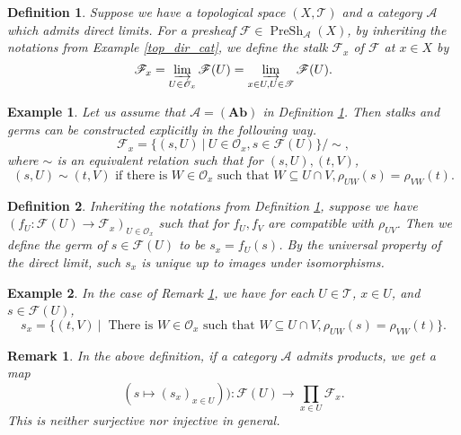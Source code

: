 \documentclass{article}
\newtheorem{definition}{Definition}[section]
\newtheorem{remark}{Remark}[section]
\newtheorem{example}{Example}[section]
\numberwithin{equation}{section}
\DeclareMathOperator{\PreSh}{PreSh}
\begin{document}
\begin{definition}
\label{def_stalk}
Suppose we have a topological space $(X,\mathcal{T})$ and a category $\mathcal{A}$ which admits direct limits. For a presheaf $\mathcal{F}\in\PreSh_{\mathcal{A}}(X)$, by inheriting the notations from Example \ref{top_dir_cat}, we define the stalk $\mathcal{F}_x$ of $\mathcal{F}$ at $x\in X$ by
\begin{equation*}
\mathcal{F}_x = \varinjlim_{U\in\mathcal{O}_x}\mathcal{F}(U) =  \varinjlim_{x\in U,U\in\mathcal{T}}\mathcal{F}(U).
\end{equation*}
\end{definition}

\begin{example}
\label{stalk_ex1}
Let us assume that $\mathcal{A}=(\mathbf{Ab})$ in Definition \ref{def_stalk}. Then stalks and germs can be constructed explicitly in the following way.
\begin{equation*}
\mathcal{F}_x = \{(s,U)\:|\: U\in\mathcal{O}_x, s\in\mathcal{F}(U)\}/\sim,
\end{equation*}
where $\sim$ is an equivalent relation such that for $(s,U),(t,V)$,
\begin{equation*}
(s,U)\sim(t,V) \text{ if there is } W\in\mathcal{O}_x \text{ such that } W\subseteq U\cap V, \rho_{UW}(s)=\rho_{VW}(t).
\end{equation*}
\end{example}

\begin{definition}
Inheriting the notations from Definition \ref{def_stalk}, suppose we have $(f_U:\mathcal{F}(U)\to\mathcal{F}_x)_{U\in\mathcal{O}_x}$ such that for $f_U, f_V$ are compatible with $\rho_{UV}$. Then we define the germ of $s\in\mathcal{F}(U)$ to be $s_x=f_U(s)$. By the universal property of the direct limit, such $s_x$ is unique up to images under isomorphisms.
\end{definition}

\begin{example}
In the case of Remark \ref{stalk_ex1}, we have for each $U\in\mathcal{T}$, $x\in U$, and $s\in\mathcal{F}(U)$,
\begin{equation*}
s_x = \{(t,V)\:|\: \text{ There is } W\in\mathcal{O}_x \text{ such that } W\subseteq U\cap V, \rho_{UW}(s)=\rho_{VW}(t)\}.
\end{equation*}
\end{example}

\begin{remark}
In the above definition, if a category $\mathcal{A}$ admits products, we get a map
\begin{equation}
\label{germ_map}
(s\mapsto (s_x)_{x\in U})):\mathcal{F}(U)\to\prod_{x\in U}\mathcal{F}_x.
\end{equation}
This is neither surjective nor injective in general.
\end{remark}
\end{document}
